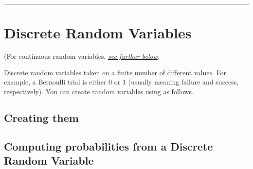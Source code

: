 \documentclass[letterpaper,10pt,english]{sphinxmanual}
\begin{document}
\begin{sphinxVerbatim}[commandchars=\\\{\}]
   
   
   
   
   
 
\end{sphinxVerbatim}


\bigskip\hrule\bigskip



\section{Discrete Random Variables}
\label{\detokenize{GB213-review-in-Python:discrete-random-variables}}
(For continuous random variables, {\hyperref[\detokenize{GB213-review-in-Python:continuous-random-variables}]{\emph{see further below}}}.

Discrete random variables taken on a finite number of different values.  For example, a Bernoulli trial is either 0 or 1 (usually meaning failure and success, respectively).  You can create random variables using  as follows.


\subsection{Creating them}
\label{\detokenize{GB213-review-in-Python:creating-them}}
\begin{sphinxVerbatim}[commandchars=\\\{\}]
      
        
\end{sphinxVerbatim}


\subsection{Computing probabilities from a Discrete Random Variable}
\label{\detokenize{GB213-review-in-Python:computing-probabilities-from-a-discrete-random-variable}}
\begin{sphinxVerbatim}[commandchars=\\\{\}]
       
\end{sphinxVerbatim}
\end{document}
